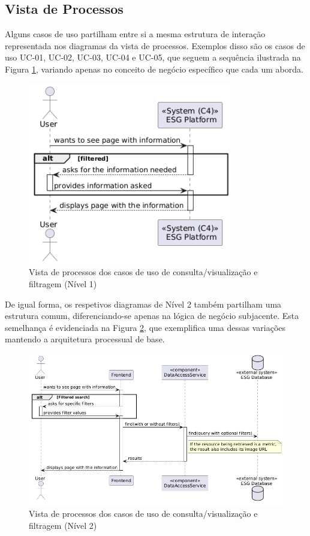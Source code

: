 \subsection{Vista de Processos}
\label{subsec:process_view}

Alguns casos de uso partilham entre si a mesma estrutura de interação representada nos diagramas da vista de processos. Exemplos disso são os casos de uso UC-01, UC-02, UC-03, UC-04 e UC-05, que seguem a sequência ilustrada na Figura \ref{fig:UC12345-lvl1}, variando apenas no conceito de negócio específico que cada um aborda.

\begin{figure}[h]
\centering
\includegraphics[width=3.5in]{frontmatter/assets/diagrams/Process Views/UC12345-lvl1.png}
\caption{Vista de processos dos casos de uso de consulta/visualização e filtragem (Nível 1)}
\label{fig:UC12345-lvl1}
\end{figure}

De igual forma, os respetivos diagramas de Nível 2 também partilham uma estrutura comum, diferenciando-se apenas na lógica de negócio subjacente. Esta semelhança é evidenciada na Figura \ref{fig:UC12345-lvl2}, que exemplifica uma dessas variações mantendo a arquitetura processual de base.

\begin{figure}[H]
\centering
\includegraphics[width=5in]{frontmatter/assets/diagrams/Process Views/UC12345-lvl2.png}
\caption{Vista de processos dos casos de uso de consulta/visualização e filtragem (Nível 2)}
\label{fig:UC12345-lvl2}
\end{figure}

